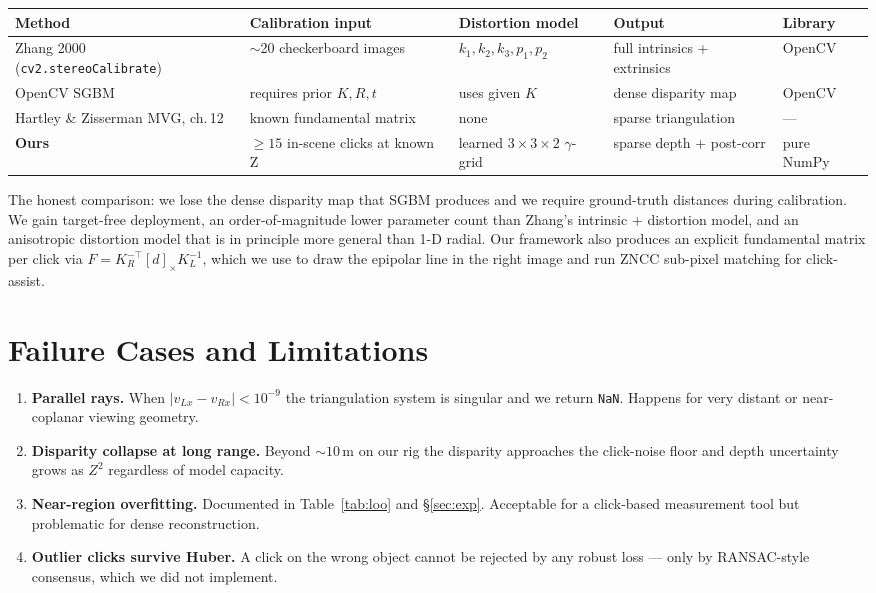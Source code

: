 \documentclass[11pt]{article}
\begin{document}
\begin{table}[h]
\centering
\begin{tabular}{p{3.2cm} p{3.5cm} p{3.5cm} p{3.3cm} p{1.8cm}}
\toprule
Method & Calibration input & Distortion model & Output & Library \\
\midrule
Zhang 2000 (\texttt{cv2.stereoCalibrate}) & $\sim$20 checkerboard images & $k_1, k_2, k_3, p_1, p_2$ & full intrinsics + extrinsics & OpenCV \\
OpenCV SGBM & requires prior $K, R, t$ & uses given $K$ & dense disparity map & OpenCV \\
Hartley \& Zisserman MVG, ch.\,12 & known fundamental matrix & none & sparse triangulation & --- \\
\textbf{Ours} & $\geq 15$ in-scene clicks at known Z & learned $3{\times}3{\times}2$ $\gamma$-grid & sparse depth + post-corr & pure NumPy \\
\bottomrule
\end{tabular}
\end{table}

The honest comparison: we lose the dense disparity map that SGBM produces and we require
ground-truth distances during calibration. We gain target-free deployment, an
order-of-magnitude lower parameter count than Zhang's intrinsic + distortion model, and
an anisotropic distortion model that is in principle more general than 1-D radial. Our
framework also produces an explicit fundamental matrix per click via $F = K_R^{-\top} [d]_\times K_L^{-1}$, which we use to draw the epipolar line in the right image and run
ZNCC sub-pixel matching for click-assist.

\section{Failure Cases and Limitations}

\begin{enumerate}[leftmargin=2em]
  \item \textbf{Parallel rays.} When $|v_{Lx} - v_{Rx}| < 10^{-9}$ the triangulation
        system is singular and we return \texttt{NaN}. Happens for very distant or
        near-coplanar viewing geometry.
  \item \textbf{Disparity collapse at long range.} Beyond $\sim 10$\,m on our rig the
        disparity approaches the click-noise floor and depth uncertainty grows as $Z^2$
        regardless of model capacity.
  \item \textbf{Near-region overfitting.} Documented in Table~\ref{tab:loo} and
        \S\ref{sec:exp}. Acceptable for a click-based measurement tool but problematic for
        dense reconstruction.
  \item \textbf{Outlier clicks survive Huber.} A click on the wrong object cannot be
        rejected by any robust loss --- only by RANSAC-style consensus, which we did not
        implement.
\end{enumerate}
\end{document}

